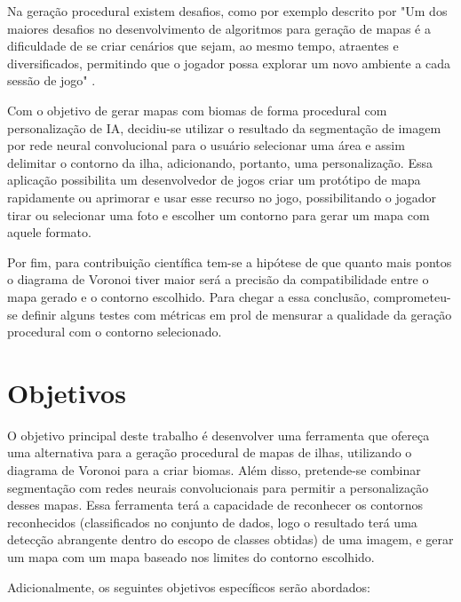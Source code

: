 Na geração procedural existem desafios, como por exemplo descrito por  "Um dos maiores desafios  no desenvolvimento de algoritmos para geração de mapas é  a  dificuldade  de  se  criar  cenários  que  sejam,  ao mesmo  tempo,  atraentes  e diversificados,  permitindo que o jogador possa explorar um novo ambiente a cada sessão de jogo" \space\cite{geracao_procedural_jogos_2d}.




Com o objetivo de gerar mapas com biomas de forma procedural com personalização de IA, decidiu-se utilizar o resultado da segmentação de imagem por rede neural convolucional para o usuário selecionar uma área e assim delimitar o contorno da ilha, adicionando, portanto, uma personalização. Essa aplicação possibilita um desenvolvedor de jogos criar um protótipo de mapa rapidamente ou aprimorar e usar esse recurso no jogo, possibilitando o jogador tirar ou selecionar uma foto e escolher um contorno para gerar um mapa com aquele formato.

Por fim, para contribuição científica tem-se a hipótese de que quanto mais pontos o diagrama de Voronoi tiver maior será a precisão da compatibilidade entre o mapa gerado e o contorno escolhido. Para chegar a essa conclusão, comprometeu-se definir alguns testes com métricas em prol de mensurar a qualidade da geração procedural com o contorno selecionado.

\section{Objetivos}

O objetivo principal deste trabalho é desenvolver uma ferramenta que ofereça uma alternativa para a geração procedural de mapas de ilhas, utilizando o diagrama de Voronoi para a criar biomas. Além disso, pretende-se combinar segmentação com redes neurais convolucionais para permitir a personalização desses mapas. Essa ferramenta terá a capacidade de reconhecer os contornos reconhecidos (classificados no conjunto de dados, logo o resultado terá uma detecção abrangente dentro do escopo de classes obtidas) de uma imagem, e gerar um mapa com um mapa baseado nos limites do contorno escolhido.

Adicionalmente, os seguintes objetivos específicos serão abordados:

